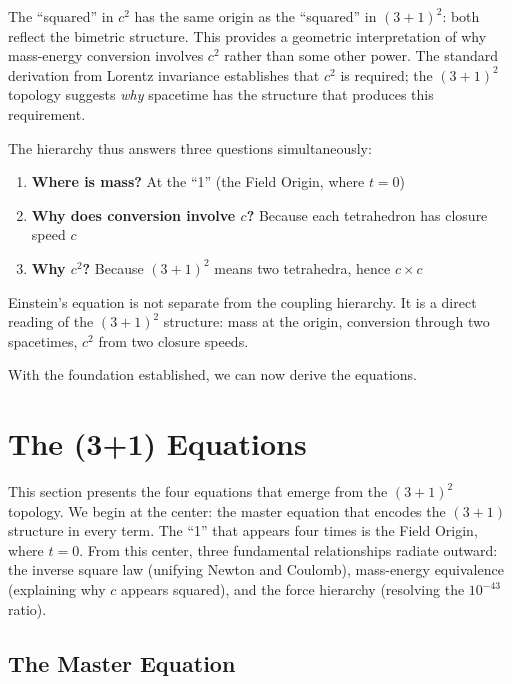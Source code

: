 \documentclass[aps,prd,preprint,superscriptaddress,showpacs,preprintnumbers,amsmath,amssymb,nofootinbib]{revtex4-2}
\begin{document}
The ``squared'' in $c^2$ has the same origin as the ``squared'' in $(3+1)^2$: both reflect the bimetric structure. This provides a geometric interpretation of why mass-energy conversion involves $c^2$ rather than some other power. The standard derivation from Lorentz invariance establishes that $c^2$ is required; the $(3+1)^2$ topology suggests \emph{why} spacetime has the structure that produces this requirement.

The hierarchy thus answers three questions simultaneously:
\begin{enumerate}
\item \textbf{Where is mass?} At the ``1'' (the Field Origin, where $t = 0$)
\item \textbf{Why does conversion involve $c$?} Because each tetrahedron has closure speed $c$
\item \textbf{Why $c^2$?} Because $(3+1)^2$ means two tetrahedra, hence $c \times c$
\end{enumerate}

Einstein's equation is not separate from the coupling hierarchy. It is a direct reading of the $(3+1)^2$ structure: mass at the origin, conversion through two spacetimes, $c^2$ from two closure speeds.

With the foundation established, we can now derive the equations.

\section{The (3+1) Equations}
\label{sec:five}

This section presents the four equations that emerge from the $(3+1)^2$ topology. We begin at the center: the master equation that encodes the $(3+1)$ structure in every term. The ``1'' that appears four times is the Field Origin, where $t = 0$. From this center, three fundamental relationships radiate outward: the inverse square law (unifying Newton and Coulomb), mass-energy equivalence (explaining why $c$ appears squared), and the force hierarchy (resolving the $10^{-43}$ ratio).

\subsection{The Master Equation}
\label{subsec:master-eq}
\end{document}
